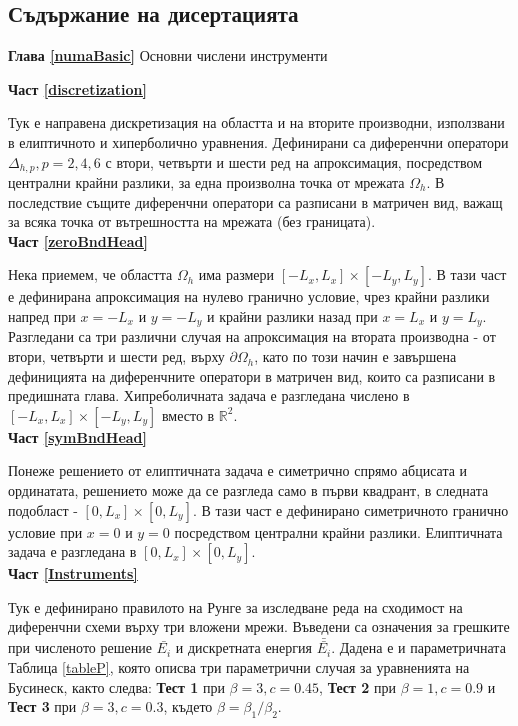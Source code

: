 \documentclass[a4paper]{article}
\newcommand{\RR}{\mathbb{R}}
\theoremstyle{remark}
\begin{document}
\begin{large}
\subsection{Съдържание на дисертацията}
 
\hspace*{\parindent}\textbf{Глава \ref{numaBasic}} Основни числени инструменти

\textbf{Част \ref{discretization}}

Тук е направена дискретизация на областта и на вторите производни, използвани в елиптичното и хиперболично уравнения. Дефинирани са диференчни оператори $\Delta_{h,p}, p=2,4,6$ с втори, четвърти и шести ред на апроксимация, посредством централни крайни разлики, за една произволна точка от мрежата $\Omega_h$. В последствие същите диференчни оператори са разписани в матричен вид, важащ за всяка точка от вътрешността на мрежата (без границата). \\

\textbf{Част \ref{zeroBndHead}}

Нека приемем, че областта $\Omega_h$ има размери $[-L_x, L_x]\times[-L_y, L_y]$. В тази част е дефинирана апроксимация на нулево гранично условие, чрез крайни разлики напред при $x=-L_x$ и $y=-L_y$ и крайни разлики назад при $x=L_x$ и $y=L_y$. Разгледани са три различни случая на апроксимация на втората производна - от втори, четвърти и шести ред, върху $\partial \Omega_h$, като по този начин е завършена дефиницията на диференчните оператори в матричен вид, които са разписани в предишната глава. Хипреболичната задача е разгледана числено в $[-L_x, L_x]\times[-L_y, L_y]$ вместо в $\RR^2$. \\

\textbf{Част \ref{symBndHead}}

Понеже решението от елиптичната задача е симетрично спрямо абцисата и ординатата, решението може да се разгледа само в първи квадрант, в следната подобласт - $[0, L_x]\times[0, L_y]$. В тази част е дефинирано симетричното гранично условие при $x=0$ и $y=0$ посредством централни крайни разлики. Елиптичната задача е разгледана в $[0, L_x]\times[0, L_y]$. \\


\textbf{Част \ref{Instruments}} 

Тук е дефинирано правилото на Рунге за изследване реда на сходимост на диференчни схеми върху три вложени мрежи. Въведени са означения за грешките при численото решение $\bar{ E_i}$ и дискретната енергия $\bar{\bar{ E_i}}$. Дадена е и параметричната Таблица \ref{tableP}, която описва три параметрични случая за уравненията на Бусинеск, както следва: \textbf{Тест 1} при $\beta = 3, c=0.45$, \textbf{Тест 2} при $\beta = 1, c=0.9$ и \textbf{Тест 3} при $\beta = 3, c=0.3$, където $\beta = \beta_1/\beta_2$. \\


\end{large}
\end{document}
